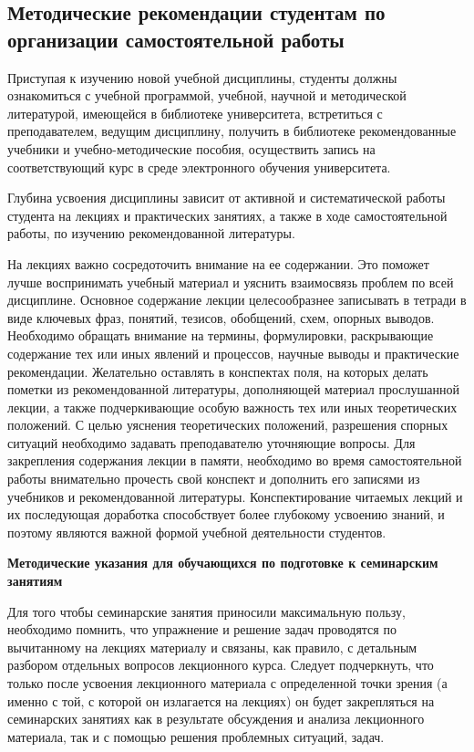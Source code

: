 \documentclass[a4paper, 12pt]{article}
\begin{document}
\subsection{Методические рекомендации студентам по организации самостоятельной работы}

Приступая к изучению новой учебной дисциплины, студенты должны ознакомиться с учебной программой, учебной, научной и методической литературой, имеющейся в библиотеке университета, встретиться с преподавателем, ведущим дисциплину, получить в библиотеке рекомендованные учебники и учебно-методические пособия, осуществить запись на соответствующий курс в среде электронного обучения университета.

Глубина усвоения дисциплины зависит от активной и систематической работы студента на лекциях и практических занятиях, а также в ходе самостоятельной работы, по изучению рекомендованной литературы. 

На лекциях важно сосредоточить внимание на ее содержании. Это поможет лучше воспринимать учебный материал и уяснить взаимосвязь проблем по всей дисциплине. Основное содержание лекции целесообразнее записывать в тетради в виде ключевых фраз, понятий, тезисов, обобщений, схем, опорных выводов. Необходимо обращать внимание на термины, формулировки, раскрывающие содержание тех или иных явлений и процессов, научные выводы и практические рекомендации. Желательно оставлять в конспектах поля, на которых делать пометки из рекомендованной литературы, дополняющей материал прослушанной лекции, а также подчеркивающие особую важность тех или иных теоретических положений. С целью уяснения теоретических положений, разрешения спорных ситуаций необходимо задавать преподавателю уточняющие вопросы. Для закрепления содержания лекции в памяти, необходимо во время самостоятельной работы внимательно прочесть свой конспект и дополнить его записями из учебников и рекомендованной литературы. Конспектирование читаемых лекций и их последующая доработка способствует более глубокому усвоению знаний, и поэтому являются важной формой учебной деятельности студентов.

\vspace{8pt}
{\bf Методические указания для обучающихся по подготовке к семинарским занятиям}

Для того чтобы семинарские занятия приносили максимальную пользу, необходимо помнить, что упражнение и решение задач проводятся по вычитанному на лекциях материалу и связаны, как правило, с детальным разбором отдельных вопросов лекционного курса. Следует подчеркнуть, что только после усвоения лекционного материала с определенной точки зрения (а именно с той, с которой он излагается на лекциях) он будет закрепляться на семинарских занятиях как в результате обсуждения и анализа лекционного материала, так и с помощью решения проблемных ситуаций, задач.
\end{document}
